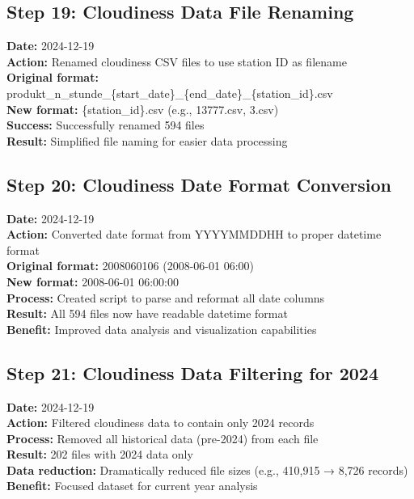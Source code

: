 \documentclass[11pt,a4paper]{article}
\begin{document}
\subsection{Step 19: Cloudiness Data File Renaming}
\textbf{Date:} 2024-12-19\\
\textbf{Action:} Renamed cloudiness CSV files to use station ID as filename\\
\textbf{Original format:} produkt\_n\_stunde\_\{start\_date\}\_\{end\_date\}\_\{station\_id\}.csv\\
\textbf{New format:} \{station\_id\}.csv (e.g., 13777.csv, 3.csv)\\
\textbf{Success:} Successfully renamed 594 files\\
\textbf{Result:} Simplified file naming for easier data processing

\subsection{Step 20: Cloudiness Date Format Conversion}
\textbf{Date:} 2024-12-19\\
\textbf{Action:} Converted date format from YYYYMMDDHH to proper datetime format\\
\textbf{Original format:} 2008060106 (2008-06-01 06:00)\\
\textbf{New format:} 2008-06-01 06:00:00\\
\textbf{Process:} Created script to parse and reformat all date columns\\
\textbf{Result:} All 594 files now have readable datetime format\\
\textbf{Benefit:} Improved data analysis and visualization capabilities

\subsection{Step 21: Cloudiness Data Filtering for 2024}
\textbf{Date:} 2024-12-19\\
\textbf{Action:} Filtered cloudiness data to contain only 2024 records\\
\textbf{Process:} Removed all historical data (pre-2024) from each file\\
\textbf{Result:} 202 files with 2024 data only\\
\textbf{Data reduction:} Dramatically reduced file sizes (e.g., 410,915 → 8,726 records)\\
\textbf{Benefit:} Focused dataset for current year analysis
\end{document}
